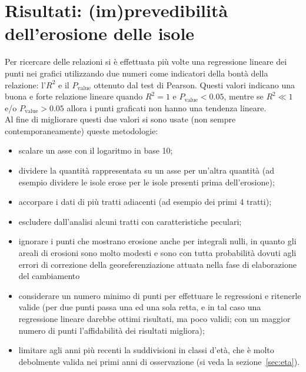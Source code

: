 \section{Risultati: (im)prevedibilità dell'erosione delle isole}
Per ricercare delle relazioni si è effettuata più volte una regressione lineare dei punti nei grafici utilizzando due numeri come indicatori della bontà della relazione: l'$R^2$ e il $P_\mathrm{value}$ ottenuto dal test di Pearson.
Questi valori indicano una buona e forte relazione lineare quando $R^2 = 1$ e $P_\mathrm{value} < 0.05$, mentre se $R^2 \ll 1$ e/o $P_\mathrm{value} > 0.05$ allora i punti graficati non hanno una tendenza lineare.
\\
Al fine di migliorare questi due valori si sono usate (non sempre contemporaneamente) queste metodologie:
%
\begin{itemize}
	\item scalare un asse con il logaritmo in base 10;
	\item dividere la quantità rappresentata su un asse per un'altra quantità (ad esempio dividere le isole erose per le isole presenti prima dell'erosione);
	\item accorpare i dati di più tratti adiacenti (ad esempio dei primi 4 tratti);
	\item escludere dall'analisi alcuni tratti con caratteristiche peculari;
	\item ignorare i punti che mostrano erosione anche per integrali nulli, in quanto gli areali di erosioni sono molto modesti e sono con tutta probabilità dovuti agli errori di correzione della georeferenziazione attuata nella fase di elaborazione del cambiamento
	\item considerare un numero minimo di punti per effettuare le regressioni e ritenerle valide (per due punti passa una ed una sola retta, e in tal caso una regressione lineare darebbe ottimi risultati, ma poco validi; con un maggior numero di punti l'affidabilità dei risultati migliora);
	\item limitare agli anni più recenti la suddivisioni in classi d'età, che è molto debolmente valida nei primi anni di osservazione (si veda la sezione~\ref{sec:eta}).
\end{itemize}

